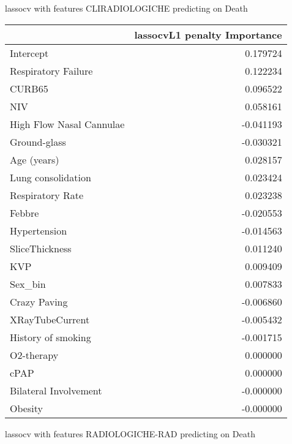 {lassocv with features CLIRADIOLOGICHE predicting on Death

\begin{tabular}{lr}
\toprule
{} &  lassocvL1 penalty Importance \\
\midrule
Intercept                &                      0.179724 \\
Respiratory Failure      &                      0.122234 \\
CURB65                   &                      0.096522 \\
NIV                      &                      0.058161 \\
High Flow Nasal Cannulae &                     -0.041193 \\
Ground-glass             &                     -0.030321 \\
Age (years)              &                      0.028157 \\
Lung consolidation       &                      0.023424 \\
Respiratory Rate         &                      0.023238 \\
Febbre                   &                     -0.020553 \\
Hypertension             &                     -0.014563 \\
SliceThickness           &                      0.011240 \\
KVP                      &                      0.009409 \\
Sex\_bin                  &                      0.007833 \\
Crazy Paving             &                     -0.006860 \\
XRayTubeCurrent          &                     -0.005432 \\
History of smoking       &                     -0.001715 \\
O2-therapy               &                      0.000000 \\
cPAP                     &                      0.000000 \\
Bilateral Involvement    &                     -0.000000 \\
Obesity                  &                     -0.000000 \\
\bottomrule
\end{tabular}

lassocv with features RADIOLOGICHE-RAD predicting on Death

}
